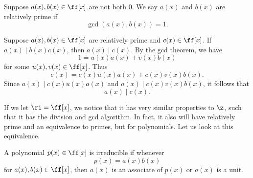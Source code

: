 \begin{definition}
    Suppose $a(x),b(x)\in\ff[x]$ are not both $0$.
    We say $a(x)$ and $b(x)$ are relatively prime if
    \[
        \gcd(a(x),b(x))=1.
    \]
\end{definition}

\begin{corollary}{
    Suppose $a(x),b(x)\in\ff[x]$ are relatively prime and $c(x)\in\ff[x]$.
    If $a(x)\mid b(x)c(x)$, then $a(x)\mid c(x)$.
}
    By the gcd theorem, we have
    \[
        1=u(x)a(x)+v(x)b(x)
    \]
    for some $u(x),v(x)\in\ff[x]$.
    Thus
    \[
        c(x)=c(x)u(x)a(x)+c(x)v(x)b(x).
    \]
    Since $a(x)\mid c(x)u(x)a(x)$ and $a(x)\mid c(x)v(x)b(x)$, it follows that
    \[
        a(x)\mid c(x).
    \]
\end{corollary}

If we let $\ri=\ff[x]$, we notice that it has very similar properties to $\z$, such that it has the division and gcd algorithm.
In fact, it also will have relatively prime and an equivalence to primes, but for polynomials.
Let us look at this equivalence.

\begin{definition}[Irreducible]
    A polynomial $p(x)\in\ff[x]$ is irreducible if whenever
    \[
        p(x)=a(x)b(x)
    \]
    for $a(x),b(x)\in\ff[x]$, then $a(x)$ is an associate of $p(x)$ or $a(x)$ is a unit.
\end{definition}